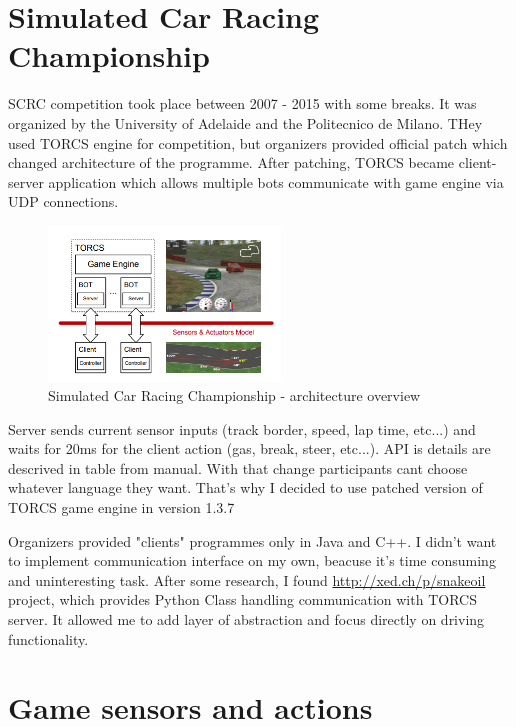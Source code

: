 \documentclass[declaration,shortabstract,english,inz]{iithesis}
\begin{document}
\section{Simulated Car Racing Championship}

SCRC competition took place between 2007 - 2015 with some breaks. It was organized by the University of Adelaide and the Politecnico de Milano. THey used TORCS engine for competition, but organizers provided official patch which changed architecture of the programme. After patching, TORCS became client-server application which allows multiple bots communicate with game engine via UDP connections. 

\begin{figure}
    \includegraphics[width=0.55\textwidth]{img/scr_architecture.png}
    \caption{Simulated Car Racing Championship - architecture overview}
    \label{fig:scrc_arc}
\end{figure}

Server sends current sensor inputs (track border, speed, lap time, etc...) and waits for 20ms for the client action (gas, break, steer, etc...). API is details are descrived in table from manual. With that change participants cant choose whatever language they want. That's why I decided to use patched version of TORCS game engine in version 1.3.7

Organizers provided "clients" programmes only in Java and C++. I didn't want to implement communication interface on my own, beacuse it's time consuming  and uninteresting task. After some research,  I found \url{http://xed.ch/p/snakeoil} project, which provides Python Class handling communication with TORCS server. It allowed me to add layer of abstraction and focus directly on driving functionality.

\section{Game sensors and actions}
    
\end{document}
